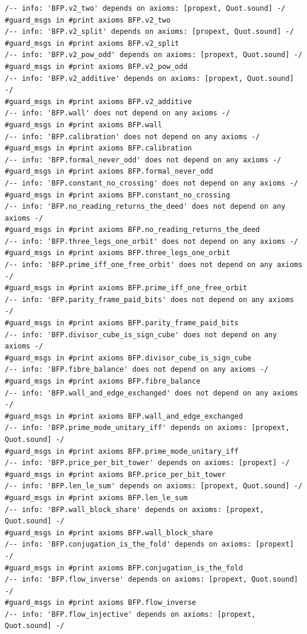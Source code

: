 \documentclass[10pt,twocolumn]{article}
\begin{document}
\begin{Verbatim}
/-- info: 'BFP.v2_two' depends on axioms: [propext, Quot.sound] -/
#guard_msgs in #print axioms BFP.v2_two
/-- info: 'BFP.v2_split' depends on axioms: [propext, Quot.sound] -/
#guard_msgs in #print axioms BFP.v2_split
/-- info: 'BFP.v2_pow_odd' depends on axioms: [propext, Quot.sound] -/
#guard_msgs in #print axioms BFP.v2_pow_odd
/-- info: 'BFP.v2_additive' depends on axioms: [propext, Quot.sound] -/
#guard_msgs in #print axioms BFP.v2_additive
/-- info: 'BFP.wall' does not depend on any axioms -/
#guard_msgs in #print axioms BFP.wall
/-- info: 'BFP.calibration' does not depend on any axioms -/
#guard_msgs in #print axioms BFP.calibration
/-- info: 'BFP.formal_never_odd' does not depend on any axioms -/
#guard_msgs in #print axioms BFP.formal_never_odd
/-- info: 'BFP.constant_no_crossing' does not depend on any axioms -/
#guard_msgs in #print axioms BFP.constant_no_crossing
/-- info: 'BFP.no_reading_returns_the_deed' does not depend on any axioms -/
#guard_msgs in #print axioms BFP.no_reading_returns_the_deed
/-- info: 'BFP.three_legs_one_orbit' does not depend on any axioms -/
#guard_msgs in #print axioms BFP.three_legs_one_orbit
/-- info: 'BFP.prime_iff_one_free_orbit' does not depend on any axioms -/
#guard_msgs in #print axioms BFP.prime_iff_one_free_orbit
/-- info: 'BFP.parity_frame_paid_bits' does not depend on any axioms -/
#guard_msgs in #print axioms BFP.parity_frame_paid_bits
/-- info: 'BFP.divisor_cube_is_sign_cube' does not depend on any axioms -/
#guard_msgs in #print axioms BFP.divisor_cube_is_sign_cube
/-- info: 'BFP.fibre_balance' does not depend on any axioms -/
#guard_msgs in #print axioms BFP.fibre_balance
/-- info: 'BFP.wall_and_edge_exchanged' does not depend on any axioms -/
#guard_msgs in #print axioms BFP.wall_and_edge_exchanged
/-- info: 'BFP.prime_mode_unitary_iff' depends on axioms: [propext, Quot.sound] -/
#guard_msgs in #print axioms BFP.prime_mode_unitary_iff
/-- info: 'BFP.price_per_bit_tower' depends on axioms: [propext] -/
#guard_msgs in #print axioms BFP.price_per_bit_tower
/-- info: 'BFP.len_le_sum' depends on axioms: [propext, Quot.sound] -/
#guard_msgs in #print axioms BFP.len_le_sum
/-- info: 'BFP.wall_block_share' depends on axioms: [propext, Quot.sound] -/
#guard_msgs in #print axioms BFP.wall_block_share
/-- info: 'BFP.conjugation_is_the_fold' depends on axioms: [propext] -/
#guard_msgs in #print axioms BFP.conjugation_is_the_fold
/-- info: 'BFP.flow_inverse' depends on axioms: [propext, Quot.sound] -/
#guard_msgs in #print axioms BFP.flow_inverse
/-- info: 'BFP.flow_injective' depends on axioms: [propext, Quot.sound] -/

\end{Verbatim}
\end{document}
